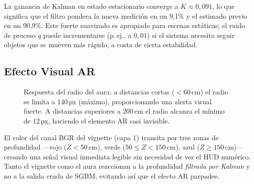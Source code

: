 \documentclass[12pt, a4paper]{article}
\begin{document}
La ganancia de Kalman en estado estacionario converge a $K \approx 0{,}091$,
lo que significa que el filtro pondera la nueva medición en un 9,1\% y el estimado
previo en un 90,9\%. Este fuerte suavizado es apropiado para escenas estáticas; el
ruido de proceso $q$ puede incrementarse (p.\,ej., a $0{,}01$) si el sistema necesita
seguir objetos que se mueven más rápido, a costa de cierta estabilidad.

\subsection{Efecto Visual AR}

\begin{figure}[htbp]
\centering
{}
\caption{Respuesta del radio del aura: a distancias cortas ($< 60$\,cm) el radio se
limita a 140\,px (máximo), proporcionando una alerta visual fuerte. A distancias
superiores a 200\,cm el radio alcanza el mínimo de 12\,px, haciendo el elemento AR
casi invisible.}
\label{fig:ar_curve}
\end{figure}

El color del canal BGR del vignette (capa 1) transita por tres zonas de profundidad
—rojo ($Z < 50$\,cm), verde ($50 \leq Z < 150$\,cm), azul ($Z \geq 150$\,cm)—
creando una señal visual inmediata legible sin necesidad de ver el HUD numérico.
Tanto el vignette como el aura reaccionan a la profundidad \emph{filtrada por Kalman}
y no a la salida cruda de SGBM, evitando así que el efecto AR parpadee.
\end{document}
